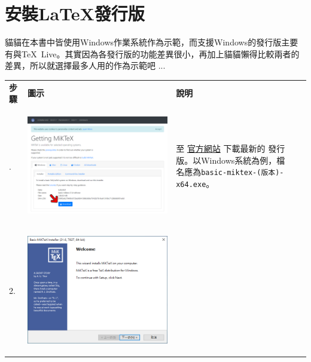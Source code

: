 \documentclass{../indiv}
\begin{document}
	\section{安裝\LaTeX 發行版 \textemdash\ }
	貓貓在本書中皆使用Windows作業系統作為示範，而支援Windows的發行版主要有與\TeX\ Live。其實因為各發行版的功能差異很小，再加上貓貓懶得比較兩者的差異，所以就選擇最多人用的作為示範吧 ...
	\begin{table}[H]
		\centering
		\OSfamily
		\setlength{\tabcolsep}{10pt}
		\begin{tabular}{T >{\ttfamily\large}p{2.5em} p{7.3cm} p{6.5cm} T}
			\Thline
			 \textrm{\textbf{\large 步驟}} & \textbf{\large 圖示} & \textbf{\large 說明} \\ . &
			\begin{tabmp}[-0.2]
				\centering
				\includegraphics[width=\linewidth]{miktex-install-1.png}
			\end{tabmp} &
			至 \href{https://miktex.org/download}{官方網站} 下載最新的 發行版。\newline 以Windows系統為例，檔名應為\texttt{basic-miktex-(版本)-x64.exe}。\\
			2. &
			\begin{tabmp}[-0.2]
				\centering
				\includegraphics[width=0.49\linewidth]{miktex-install-2.png}

\end{tabmp}
\end{tabular}
\end{table}
\end{document}
